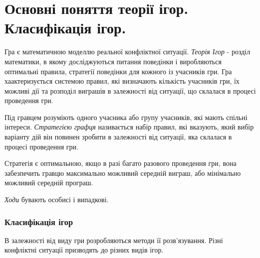 \documentclass[12pt,a4paper]{report}
\begin{document}
\clearpage

\chapter{Основні поняття теорії ігор. Класифікація ігор.}

Гра є математичною моделлю реальної конфліктної ситуації. \emph{Теорія Ігор} - розділ математики, в якому досліджуються питання поведінки і виробляються оптимальні правила, стратегії поведінки для кожного із учасників гри. Гра хаактеризується системою правил, які визначають кількість учасників гри, їх можливі дії та розподіл виграшів в залежності від ситуації, що склалася в процесі проведення гри.

Під гравцем розуміють одного учасника або групу учасників, які мають спільні інтереси. \emph{Стратегією графця} називається набір правил, які вказують, який вибір варіанту дій він повинен зробити в залежності від ситуації, яка склалася в процесі проведення гри.

Стратегія є оптимальною, якщо в разі багато разового проведення гри, вона забезпечить гравцю максимально можливий середній виграш, або мінімально можливий середній програш.

\emph{Ходи} бувають особисі і випадкові.

\subsection*{Класифікація ігор}

В залежності від виду гри розробляються методи її розв'язування. Різні конфліктні ситуації призводять до різних видів ігор.
\end{document}
